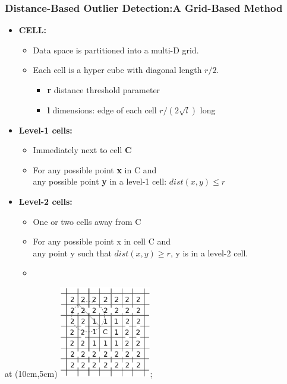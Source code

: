 \documentclass[aspectratio=169,t,xcolor=dvipsnames]{beamer}
\begin{document}
\begin{frame}
	\frametitle{Distance-Based Outlier Detection:A Grid-Based Method}
	\begin{itemize}
		\item \textbf{CELL:}
		      \begin{itemize}
		      	\item Data space is partitioned into a multi-D grid.
		      	\item Each cell is a hyper cube with diagonal length $r/2$.
		      	      \begin{itemize}
		      	      	\item \alert{\textbf{r}} distance threshold parameter
		      	      	\item \alert{\textbf{l}} dimensions: edge of each cell $r / (2\sqrt{l})$ long
		      	      \end{itemize}
		      \end{itemize}
		\item \textbf{Level-1 cells:}
		      \begin{itemize}
		      	\item Immediately next to cell \alert{\textbf{C}}
		      	\item For any possible point \alert{\textbf{x}} in C and\\ any possible point \alert{\textbf{y}} in a level-1 cell: $dist(x,y) \leq r$
		      \end{itemize}
		\item \textbf{Level-2 cells:}
		      \begin{itemize}
		      	\item One or two cells away from C
		      	\item For any possible point x  in cell C and\\ any point y such that $dist(x,y) \geq r$, y is in a level-2 cell.
		      	\item 
		      \end{itemize}
	\end{itemize}
	\tikzoverlay at (10cm,5cm) {\includegraphics[width=0.3\textwidth]{img/grid8.png}};
\end{frame}
\end{document}
